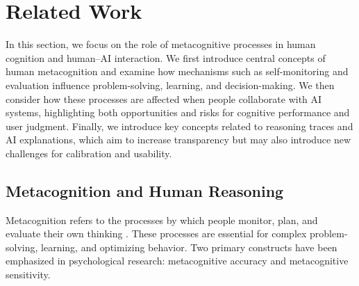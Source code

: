 \documentclass[acmlarge,review=true, anonymous=true]{acmart}
\newcommand{\daniela}[1]{\textcolor{colordaniela}{\textbf{\faComment~Daniela:} #1}}
\begin{document}










\section{Related Work}

In this section, we focus on the role of metacognitive processes in human cognition and human–AI interaction. We first introduce central concepts of human metacognition and examine how mechanisms such as self-monitoring and evaluation influence problem-solving, learning, and decision-making. We then consider how these processes are affected when people collaborate with AI systems, highlighting both opportunities and risks for cognitive performance and user judgment. Finally, we introduce key concepts related to reasoning traces and AI explanations, which aim to increase transparency but may also introduce new challenges for calibration and usability.

\subsection{Metacognition and Human Reasoning}\label{sec:human_metacognition}
Metacognition refers to the processes by which people monitor, plan, and evaluate their own thinking \cite{fleming2024metacognition}. These processes are essential for complex problem-solving, learning, and optimizing behavior. Two primary constructs have been emphasized in psychological research: metacognitive accuracy and metacognitive sensitivity.
\end{document}
